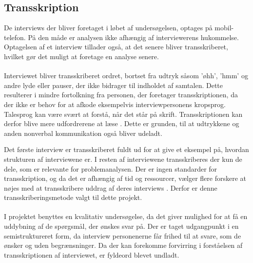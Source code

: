 \subsection{Transskription}
De interviews der bliver foretaget i løbet af undersøgelsen, optages på mobil-telefon. På den måde er analysen ikke afhængig af interviewerens hukommelse. Optagelsen af et interview tillader også, at det senere bliver transskriberet, hvilket gør det muligt at foretage en analyse senere. 
\\\\
Interviewet bliver transskriberet ordret, bortset fra udtryk såsom 'øhh', 'hmm' og andre lyde eller pauser, der ikke bidrager til indholdet af samtalen. Dette resulterer i mindre fortolkning fra personen, der foretager transskriptionen, da der ikke er behov for at afkode eksempelvis interviewpersonens kropsprog. Talesprog kan være svært at forstå, når det står på skrift. Transskriptionen kan derfor blive mere udfordrerene at læse \citep{kvale2015}. Dette er grunden, til at udtrykkene og anden nonverbal kommunikation også bliver udeladt. 
\par
Det første interview er transskriberet fuldt ud for at give et eksempel på, hvordan strukturen af interviewene er. I resten af interviewene transskriberes der kun de dele, som er relevante for problemanalysen. Der er ingen standarder for transskription, og da det er afhængig af tid og ressourcer, vælger flere forskere at nøjes med at transskribere uddrag af deres interviews \citep{brinkmann2014}\citep{kvale2015}. Derfor er denne transskriberingsmetode valgt til dette projekt.
\\\\
I projektet benyttes en kvalitativ undersøgelse, da det giver mulighed for at få en uddybning af de spørgsmål, der ønskes svar på. Der er taget udgangpunkt i en semistruktureret form, da interview personenerne får frihed til at svare, som de ønsker og uden begrænsninger. Da der kan forekomme forvirring i forståelsen af transskriptionen af interviewet, er fyldeord blevet undladt.